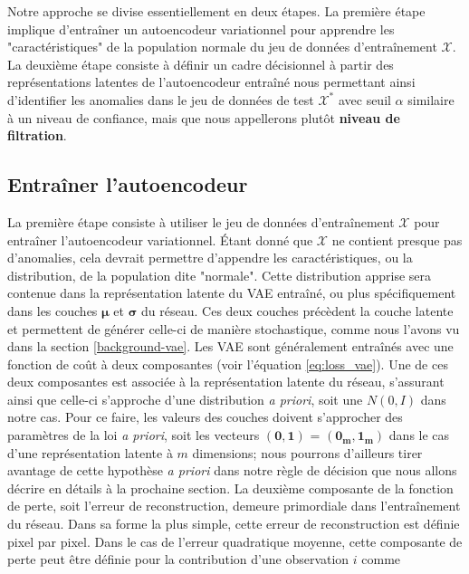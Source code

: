 Notre approche se divise essentiellement en deux étapes. La première étape implique d'entraîner un autoencodeur variationnel pour apprendre les "caractéristiques" de la population normale du jeu de données d'entraînement $\mathcal{X}$. La deuxième étape consiste à définir un cadre décisionnel à partir des représentations latentes de l'autoencodeur entraîné nous permettant ainsi d'identifier les anomalies dans le jeu de données de test $\mathcal{X^*}$ avec seuil $\alpha$ similaire à un niveau de confiance, mais que nous appellerons plutôt \textbf{niveau de filtration}.

\subsection{Entraîner l'autoencodeur} \label{meth:train-vae}

La première étape consiste à utiliser le jeu de données d'entraînement $\mathcal{X}$ pour entraîner l'autoencodeur variationnel. Étant donné que $\mathcal{X}$ ne contient presque pas d'anomalies, cela devrait permettre d'appendre les caractéristiques, ou la distribution, de la population dite "normale". Cette distribution apprise sera contenue dans la représentation latente du VAE entraîné, ou plus spécifiquement dans les couches $\boldsymbol{\mu}$ et $\boldsymbol{\sigma}$ du réseau. Ces deux couches précèdent la couche latente et permettent de générer celle-ci de manière stochastique, comme nous l'avons vu dans la section \ref{background-vae}. Les VAE sont généralement entraînés avec une fonction de coût à deux composantes (voir l'équation \ref{eq:loss_vae}). Une de ces deux composantes est associée à la représentation latente du réseau, s'assurant ainsi que celle-ci s'approche d'une distribution \textit{a priori}, soit une $N(0, I)$ dans notre cas. Pour ce faire, les valeurs des couches \DIFdelbegin {}\DIFdelend \DIFaddbegin {}\DIFaddend doivent s'approcher des paramètres de la loi \textit{a priori}, soit les vecteurs $(\mathbf{0}, \mathbf{1})$ = $(\boldsymbol{0_m}, \boldsymbol{1_m})$ dans le cas d'une représentation latente à $m$ dimensions; nous pourrons d'ailleurs tirer avantage de cette hypothèse \textit{a priori} dans notre règle de décision que nous allons décrire en détails à la prochaine section. La deuxième composante de la fonction de perte, soit l'erreur de reconstruction, demeure primordiale dans l'entraînement du réseau. Dans sa forme la plus simple, cette erreur de reconstruction est définie pixel par pixel. Dans le cas de l'erreur quadratique moyenne, cette composante de perte peut être définie pour la contribution d'une observation $i$ comme

